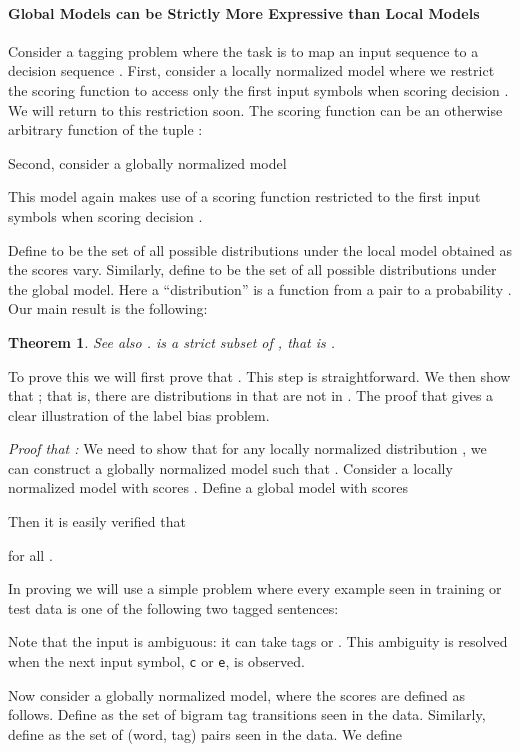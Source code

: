 \documentclass[11pt]{article}
\newtheorem{theorem}{Theorem}[section]
\begin{document}
\paragraph{Global Models can be Strictly More Expressive than
Local Models}
Consider a tagging problem where the task is to map an input sequence
 to a decision sequence .
First, consider a locally normalized model
where we restrict the scoring function to access only the first
 input symbols  when scoring decision .
We will return to this restriction soon.
The scoring function  can be an otherwise arbitrary function of the
tuple :


Second, consider a globally normalized model

This model again makes use of a scoring function  restricted to the first  input symbols when
scoring decision .

Define  to be the set of all possible distributions
 under the local model obtained
as the scores  vary. Similarly, define  to be the
set of all possible distributions 
under the global model. Here a ``distribution'' is a function
from a pair  to a probability
.
Our main result is the following:

\begin{theorem} See also .
\hspace*{0.5cm} is a strict subset of , that is .
\end{theorem}

To prove this we will first prove that . This step is straightforward. We then show that
; that is, there are distributions
in  that are not in .
The proof that  gives a clear
illustration of the label bias problem.


{\em Proof that :} 
We need to show that for any locally normalized
distribution , we can construct a globally normalized model 
such that .
Consider a locally normalized model with scores
.
Define a global model  with scores

Then it is easily verified that 

for all .


In proving  we will use a
simple problem where every example seen in training or test data is
one of the following two tagged sentences:


Note that the input  is ambiguous: it can take tags
 or . This ambiguity is resolved when the next
input symbol, {\tt c} or {\tt e}, is observed.

Now consider a globally normalized model, where the scores
 are defined as follows. 
Define  as the set 
of bigram tag transitions seen in the data. Similarly, define  as the set  of
(word, tag) pairs seen in the data. We define 
\end{document}
